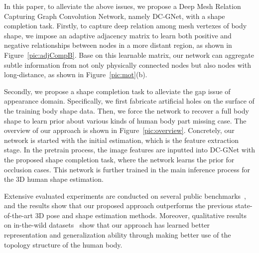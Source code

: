 \documentclass[sigplan]{acmart}
\begin{document}
In this paper, to alleviate the above issues, we propose a Deep Mesh Relation Capturing Graph Convolution Network, namely DC-GNet, with a shape completion task. Firstly, to capture deep relation among mesh vertexes of body shape, we impose an adaptive adjacency matrix to learn both positive and negative relationships between nodes in a more distant region, as shown in Figure~\ref{pic:adjCompB}. Base on this learnable matrix, our network can aggregate subtle information from not only physically connected nodes but also nodes with long-distance, as shown in Figure~\ref{pic:mot}(b). 

Secondly, we propose a shape completion task to alleviate the gap issue of appearance domain. Specifically, we first fabricate artificial holes on the surface of the training body shape data. Then, we force the network to recover a full body shape to learn prior about various kinds of human body part missing case. The overview of our approach is shown in Figure~\ref{pic:overview}. Concretely, our network is started with the initial estimation, which is the feature extraction stage. In the pretrain process, the image features are inputted into DC-GNet with the proposed shape completion task, where the network learns the prior for occlusion cases. This network is further trained in the main inference process for the 3D human shape estimation.

Extensive evaluated experiments are conducted on several public benchmarks~\cite{2014Human3,mono-3dhp2017}, and the results show that our proposed approach outperforms the previous state-of-the-art 3D pose and shape estimation methods. Moreover, qualitative results on in-the-wild datasets~\cite{2014Human,lin2014microsoft} show that our approach has learned better representation and generalization ability through making better use of the topology structure of the human body.
\end{document}
